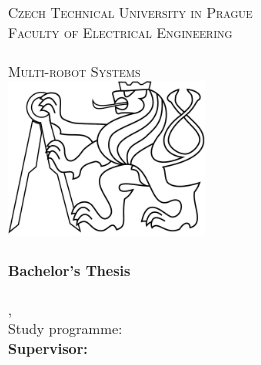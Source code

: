 
\begin{titlepage}
  \begin{center}

    \textsc{\Large Czech Technical University in Prague}\\[1em]
    \textsc{\large Faculty of Electrical Engineering\\
    \Department\\
    Multi-robot Systems\\[3em]
    }
    \includegraphics[height=4.1cm]{fig/ctu_lion.pdf}\\[3em]

    \textbf{\textsc{\Huge \Title}}\\[2em]

    \textbf{\Large Bachelor's Thesis}\\[6em]

    \textbf{\huge \Author}\\[6em]

    {\large \Location, \Date}\\[3em]

    Study programme: \Programme\\[6em]

    \textbf{Supervisor: \Supervisor}\\

    \vspace{2pt}

  \end{center}
\end{titlepage}
